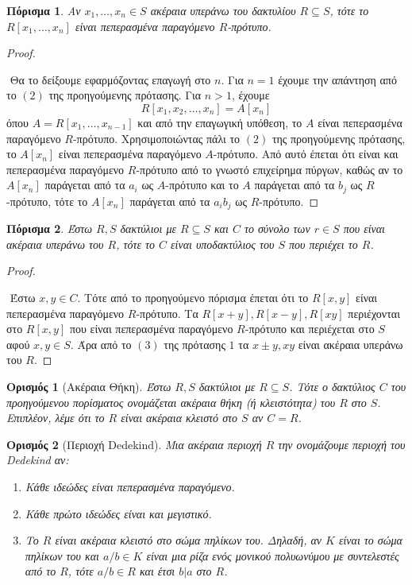 \documentclass[oneside,a4paper]{article}
\newtheorem*{defn}{Ορισμός}
\newtheorem{cor}{Πόρισμα}
\newcommand {\tl}{\textlatin}
\begin{document}
\begin{cor}
	Αν $x_1,\ldots,x_n \in S$ ακέραια υπεράνω του δακτυλίου $R \subseteq S$, τότε το $R[x_1,\ldots,x_n]$ είναι πεπερασμένα παραγόμενο $R$-πρότυπο.
\end{cor}
\vspace*{0.1cm}
\begin{proof} $ $

	$ $\newline
	Θα το δείξουμε εφαρμόζοντας επαγωγή στο $n$. Για $n=1$ έχουμε την απάντηση από το $(2)$ της προηγούμενης πρότασης. Για $n>1$, έχουμε $$R[x_1,x_2,\ldots,x_n] = A [x_n]$$ όπου $A = R[x_1,\ldots,x_{n-1}]$ και από την επαγωγική υπόθεση, το $A$ είναι πεπερασμένα παραγόμενο $R$-πρότυπο. Χρησιμοποιώντας πάλι το $(2)$ της προηγούμενης πρότασης, το $A[x_n]$ είναι πεπερασμένα παραγόμενο $A$-πρότυπο. Από αυτό έπεται ότι είναι και πεπερασμένα παραγόμενο $R$-πρότυπο από το γνωστό επιχείρημα πύργων, καθώς αν το $A[x_n]$ παράγεται από τα $a_i$ ως $A$-πρότυπο και το $A$ παράγεται από τα $b_j$ ως $R$-πρότυπο, τότε το $A[x_n]$ παράγεται από τα $a_i b_j$ ως $R$-πρότυπο.
\end{proof}

\begin{cor}
	Έστω $R,S$ δακτύλιοι με $R\subseteq S$ και $C$ το σύνολο των $r \in S$ που είναι ακέραια υπεράνω του $R$, τότε το $C$ είναι υποδακτύλιος του $S$ που περιέχει το $R$. 
\end{cor}
\vspace*{0.1cm}
\begin{proof} $ $

	$ $\newline
	Έστω $x,y \in C$. Τότε από το προηγούμενο πόρισμα έπεται ότι το $R[x,y]$ είναι πεπερασμένα παραγόμενο $R$-πρότυπο.  Τα $R[x+y],R[x-y],R[xy]$ περιέχονται στο $R[x,y]$ που είναι πεπερασμένα παραγόμενο $R$-πρότυπο και περιέχεται στο $S$ αφού $x,y \in S$. Άρα από το $(3)$ της πρότασης $1$ τα $x\pm y,xy$ είναι ακέραια υπεράνω του $R$.

\end{proof}
\begin{defn}[Ακέραια Θήκη] 
	Έστω $R,S$ δακτύλιοι με $R \subseteq S$. Τότε ο δακτύλιος $C$ του προηγούμενου πορίσματος ονομάζεται ακέραια θήκη (ή κλειστότητα) του $R$ στο $S$. Επιπλέον, λέμε ότι το $R$ είναι ακέραια κλειστό στο $S$ αν $C=R$.
\end{defn}


\begin{defn}[Περιοχή \tl{Dedekind}]
	Μια ακέραια περιοχή $R$ την ονομάζουμε περιοχή του \tl{Dedekind} αν:
	\begin{enumerate}
		\item Κάθε ιδεώδες είναι πεπερασμένα παραγόμενο.
		\item Κάθε πρώτο ιδεώδες είναι και μεγιστικό.
		\item Το $R$ είναι ακέραια κλειστό στο σώμα πηλίκων του. Δηλαδή, αν $K$ είναι το σώμα πηλίκων του και $a/b \in K$ είναι μια ρίζα ενός μονικού πολυωνύμου με συντελεστές από το $R$, τότε $a/b \in R$ και έτσι $b|a$ στο $R$.
	\end{enumerate}
\end{defn}
\end{document}
